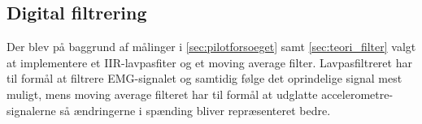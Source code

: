 \subsection{Digital filtrering}
Der blev på baggrund af målinger i \autoref{sec:pilotforsoeget} samt \autoref{sec:teori_filter} valgt at implementere et IIR-lavpasfiter og et moving average filter. Lavpasfiltreret har til formål at filtrere EMG-signalet og samtidig følge det oprindelige signal mest muligt, mens moving average filteret har til formål at udglatte accelerometre-signalerne så ændringerne i spænding bliver repræsenteret bedre. 